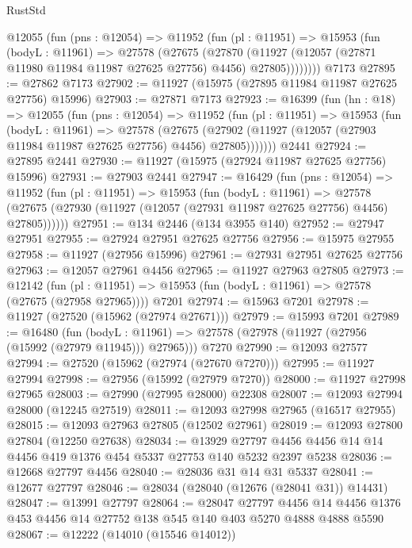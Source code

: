 \begin{lexlean}{RustStd}
\begin{coremodule}
      @12055
        (fun (pns : @12054) =>
        @11952
          (fun (pl : @11951) =>
          @15953
            (fun (bodyL : @11961) =>
            @27578
              (@27675
                (@27870
                  (@11927 (@12057 (@27871 @11980 @11984 @11987 @27625 @27756) @4456) @27805))))))))
    @7173
@27895 := @27862 @7173
@27902 := @11927 (@15975 (@27895 @11984 @11987 @27625 @27756) @15996)
@27903 := @27871 @7173
@27923 := @16399
    (fun (hn : @18) =>
    @12055
      (fun (pns : @12054) =>
      @11952
        (fun (pl : @11951) =>
        @15953
          (fun (bodyL : @11961) =>
          @27578
            (@27675
              (@27902 (@11927 (@12057 (@27903 @11984 @11987 @27625 @27756) @4456) @27805)))))))
    @2441
@27924 := @27895 @2441
@27930 := @11927 (@15975 (@27924 @11987 @27625 @27756) @15996)
@27931 := @27903 @2441
@27947 := @16429
    (fun (pns : @12054) =>
    @11952
      (fun (pl : @11951) =>
      @15953
        (fun (bodyL : @11961) =>
        @27578 (@27675 (@27930 (@11927 (@12057 (@27931 @11987 @27625 @27756) @4456) @27805))))))
@27951 := @134 @2446 (@134 @3955 @140)
@27952 := @27947 @27951
@27955 := @27924 @27951 @27625 @27756
@27956 := @15975 @27955
@27958 := @11927 (@27956 @15996)
@27961 := @27931 @27951 @27625 @27756
@27963 := @12057 @27961 @4456
@27965 := @11927 @27963 @27805
@27973 := @12142
    (fun (pl : @11951) => @15953 (fun (bodyL : @11961) => @27578 (@27675 (@27958 @27965))))
    @7201
@27974 := @15963 @7201
@27978 := @11927 (@27520 (@15962 (@27974 @27671)))
@27979 := @15993 @7201
@27989 := @16480
    (fun (bodyL : @11961) => @27578 (@27978 (@11927 (@27956 (@15992 (@27979 @11945))) @27965)))
    @7270
@27990 := @12093 @27577
@27994 := @27520 (@15962 (@27974 (@27670 @7270)))
@27995 := @11927 @27994
@27998 := @27956 (@15992 (@27979 @7270))
@28000 := @11927 @27998 @27965
@28003 := @27990 (@27995 @28000) @22308
@28007 := @12093 @27994 @28000 (@12245 @27519)
@28011 := @12093 @27998 @27965 (@16517 @27955)
@28015 := @12093 @27963 @27805 (@12502 @27961)
@28019 := @12093 @27800 @27804 (@12250 @27638)
@28034 := @13929
    @27797
    @4456
    @4456
    @14
    @14
    @4456
    @419
    @1376
    @454
    @5337
    @27753
    @140
    @5232
    @2397
    @5238
@28036 := @12668 @27797 @4456
@28040 := @28036 @31 @14 @31 @5337
@28041 := @12677 @27797
@28046 := @28034 (@28040 (@12676 (@28041 @31)) @14431)
@28047 := @13991 @27797
@28064 := @28047
    @27797
    @4456
    @14
    @4456
    @1376
    @453
    @4456
    @14
    @27752
    @138
    @545
    @140
    @403
    @5270
    @4888
    @4888
    @5590
@28067 := @12222 (@14010 (@15546 @14012))

\end{coremodule}
\end{lexlean}
